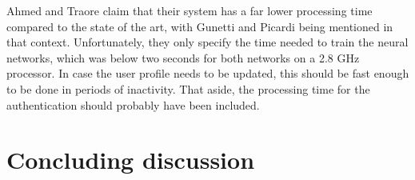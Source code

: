 \documentclass[informationsecurity]{gucmasterproject}
\begin{document}
Ahmed and Traore \cite{Ahmed} claim that their system has a far lower processing time compared to the state of the art, with Gunetti and Picardi \cite{gnp} being mentioned in that context.
Unfortunately, they only specify the time needed to train the neural networks, which was below two seconds for both networks on a 2.8 GHz processor.
In case the user profile needs to be updated, this should be fast enough to be done in periods of inactivity.
That aside, the processing time for the authentication should probably have been included.








\chapter{Concluding discussion}
\label{chap:conclusion}





%

\end{document}
